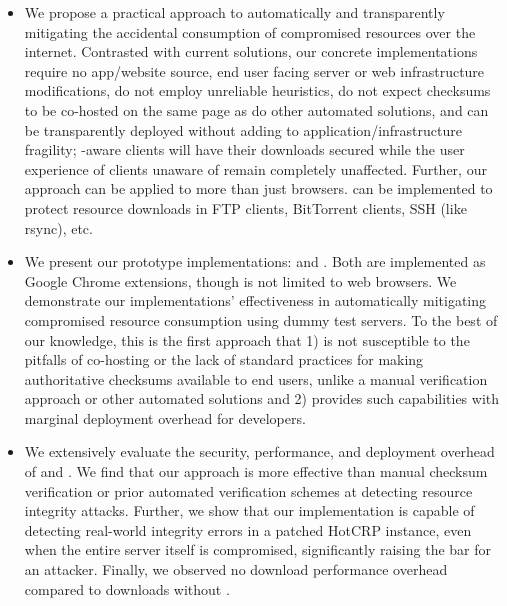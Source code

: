 \begin{itemize}

  \item We propose a practical approach to automatically and transparently
  mitigating the accidental consumption of compromised resources over the
  internet. Contrasted with current solutions, our concrete implementations
  require no app/website source, end user facing server or web infrastructure
  modifications, do not employ unreliable heuristics, do not expect checksums to
  be co-hosted on the same page as do other automated solutions, and can be
  transparently deployed without adding to application/infrastructure fragility;
  \eg \SYSTEM{}-aware clients will have their downloads secured while the user
  experience of clients unaware of \SYSTEM{} remain completely unaffected.
  Further, our approach can be applied to more than just browsers. \SYSTEM{} can
  be implemented to protect resource downloads in FTP clients, BitTorrent
  clients, SSH (like rsync), etc.

  \item We present our prototype \SYSTEM{} implementations: \DNSSYS{} and
  \DHTSYS{}. Both are implemented as Google Chrome extensions, though \SYSTEM{}
  is not limited to web browsers. We demonstrate our implementations'
  effectiveness in automatically mitigating compromised resource consumption
  using dummy test servers. To the best of our knowledge, this is the first
  approach that 1) is not susceptible to the pitfalls of co-hosting or the lack
  of standard practices for making authoritative checksums available to end
  users, unlike a manual verification approach or other automated solutions and
  2) provides such capabilities with marginal deployment overhead for
  developers.

  \item We extensively evaluate the security, performance, and deployment
  overhead of \DNSSYS{} and \DHTSYS{}. We find that our approach is more
  effective than manual checksum verification or prior automated verification
  schemes at detecting resource integrity attacks. Further, we show that our
  \DNSSYS{} implementation is capable of detecting real-world integrity errors
  in a patched HotCRP instance, even when the entire server itself is
  compromised, significantly raising the bar for an attacker. Finally, we
  observed no download performance overhead compared to downloads without
  \DNSSYS{}.

\end{itemize}
